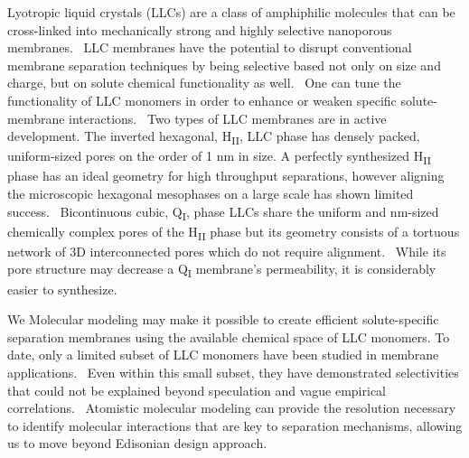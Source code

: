 \documentclass{article}
\begin{document}
  Lyotropic liquid crystals (LLCs) are a class of amphiphilic molecules that can be 
  cross-linked into mechanically strong and highly selective nanoporous membranes.~\cite{gin_polymerized_2008}
  LLC membranes have the potential to disrupt conventional membrane separation techniques by 
  being selective based not only on size and charge, but on solute chemical functionality
  as well.~\cite{dischinger_application_2017} One can tune the functionality of LLC monomers
  in order to enhance or weaken specific solute-membrane interactions.~\cite{dischinger_effect_2017}
  Two types of LLC membranes are in active development. The inverted hexagonal, 
  H\textsubscript{II}, LLC phase has densely packed, uniform-sized pores on the order of 1 nm
  in size. A perfectly synthesized H\textsubscript{II} phase has an ideal geometry for high
  throughput separations, however aligning the microscopic hexagonal mesophases on a large 
  scale has shown limited success.~\cite{feng_scalable_2014,feng_thin_2016} Bicontinuous cubic,
  Q\textsubscript{I}, phase LLCs share the uniform and nm-sized chemically complex pores of
  the H\textsubscript{II} phase but its geometry consists of a tortuous network of 3D 
  interconnected pores which do not require alignment.~\cite{carter_glycerol-based_2012} While 
  its pore structure may decrease a Q\textsubscript{I} membrane's permeability, it is considerably
  easier to synthesize.
  
  We 
  Molecular modeling may make it possible to create efficient solute-specific
  separation membranes using the available chemical space of LLC monomers.
  To date, only a limited subset of LLC monomers have been studied in membrane
  applications.~\cite{carter_glycerol-based_2012,hatakeyama_nanoporous_2010,smith_ordered_1997,zhou_assembly_2003,resel_structural_2000}
  Even within this small subset, 
  they have demonstrated selectivities that could not be
  explained beyond speculation and vague empirical correlations.~\cite{dischinger_application_2017}
  Atomistic molecular modeling 
  can provide
  the resolution necessary to identify molecular 
  interactions that are key to separation mechanisms, allowing us to move beyond 
  Edisonian design approach.
\end{document}
